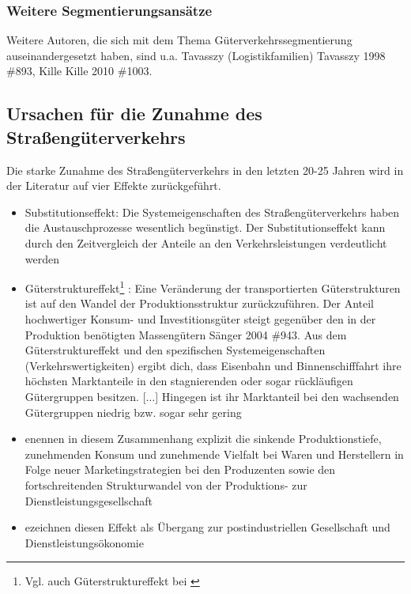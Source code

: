 % 
\subsubsection{Weitere Segmentierungsansätze}
\label{_Toc366766093}
\label{_Toc366775287}
Weitere Autoren, die sich mit dem Thema Güterverkehrssegmentierung auseinandergesetzt haben, sind u.a. Tavasszy (Logistikfamilien) {Tavasszy 1998 \#893}, Kille {Kille 2010 \#1003}.~\\


% 
\subsection{Ursachen für die Zunahme des Straßengüterverkehrs}
\label{_Toc365801595}
\label{_Toc366766094}
\label{_Toc366775288}
Die starke Zunahme des Straßengüterverkehrs in den letzten 20-25 Jahren wird in der Literatur auf vier Effekte zurückgeführt.~\\

\begin{itemize}
%
   \item Substitutionseffekt: \glqq Die Systemeigenschaften des Straßengüterverkehrs haben die Austauschprozesse wesentlich begünstigt. Der Substitutionseffekt kann durch den Zeitvergleich der Anteile an den Verkehrsleistungen verdeutlicht werden\grqq   \autocites[][]{bib.739}
\label{_Toc347467538} 
   \item Güterstruktureffekt\footnote{%
 Vgl. auch Güterstruktureffekt bei  \autocites[][]{bib.876}
}%
: Eine Veränderung der transportierten Güterstrukturen ist auf den Wandel der Produktionsstruktur zurückzuführen. Der Anteil hochwertiger Konsum- und Investitionsgüter steigt gegenüber den in der Produktion benötigten Massengütern {Sänger 2004 \#943}. \glqq Aus dem Güterstruktureffekt und den spezifischen Systemeigenschaften (Verkehrswertigkeiten) ergibt dich, dass Eisenbahn und Binnenschifffahrt ihre höchsten Marktanteile in den stagnierenden oder sogar rückläufigen Gütergruppen besitzen. [$\ldots$] Hingegen ist ihr Marktanteil bei den wachsenden Gütergruppen niedrig bzw. sogar sehr gering\grqq   \autocites[][]{bib.739} 
\label{_Toc347467539}
%
\end{itemize}

\begin{itemize}
%
   \item  \citeauthor{bib.876} enennen in diesem Zusammenhang explizit die sinkende Produktionstiefe, zunehmenden Konsum und zunehmende Vielfalt bei Waren und Herstellern in Folge neuer Marketingstrategien bei den Produzenten sowie den fortschreitenden Strukturwandel von der Produktions- zur Dienstleistungsgesellschaft  \autocites[][]{bib.876}
   \item  \citeauthor{bib.371} ezeichnen diesen Effekt als \glqq Übergang zur postindustriellen Gesellschaft und Dienstleistungsökonomie\grqq   \autocites[][]{bib.371}
%
\end{itemize}


